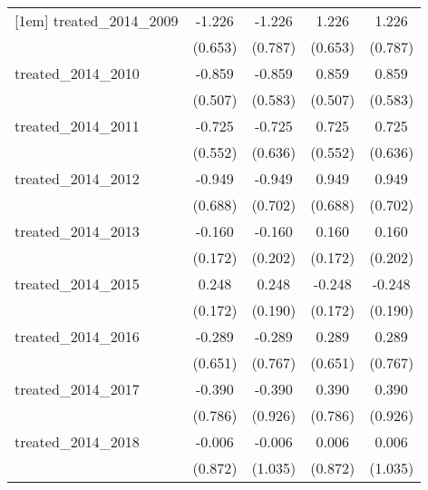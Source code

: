 {\begin{tabular}{l*{4}{c}}
[1em]
treated\_2014\_2009&      -1.226         &      -1.226         &       1.226         &       1.226         \\
            &     (0.653)         &     (0.787)         &     (0.653)         &     (0.787)         \\
[1em]
treated\_2014\_2010&      -0.859         &      -0.859         &       0.859         &       0.859         \\
            &     (0.507)         &     (0.583)         &     (0.507)         &     (0.583)         \\
[1em]
treated\_2014\_2011&      -0.725         &      -0.725         &       0.725         &       0.725         \\
            &     (0.552)         &     (0.636)         &     (0.552)         &     (0.636)         \\
[1em]
treated\_2014\_2012&      -0.949         &      -0.949         &       0.949         &       0.949         \\
            &     (0.688)         &     (0.702)         &     (0.688)         &     (0.702)         \\
[1em]
treated\_2014\_2013&      -0.160         &      -0.160         &       0.160         &       0.160         \\
            &     (0.172)         &     (0.202)         &     (0.172)         &     (0.202)         \\
[1em]
treated\_2014\_2015&       0.248         &       0.248         &      -0.248         &      -0.248         \\
            &     (0.172)         &     (0.190)         &     (0.172)         &     (0.190)         \\
[1em]
treated\_2014\_2016&      -0.289         &      -0.289         &       0.289         &       0.289         \\
            &     (0.651)         &     (0.767)         &     (0.651)         &     (0.767)         \\
[1em]
treated\_2014\_2017&      -0.390         &      -0.390         &       0.390         &       0.390         \\
            &     (0.786)         &     (0.926)         &     (0.786)         &     (0.926)         \\
[1em]
treated\_2014\_2018&      -0.006         &      -0.006         &       0.006         &       0.006         \\
            &     (0.872)         &     (1.035)         &     (0.872)         &     (1.035)         \\

\end{tabular}}
